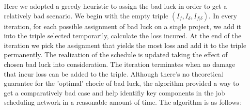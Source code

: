 \documentclass[final,3p,times]{elsarticle}
\begin{document}
Here we adopted a greedy heuristic to assign the bad luck in order to get a relatively bad scenario. We begin with the empty triple  $(I_f, I_{\delta}, I_{f|\delta})$. In every iteration, for each possible assignment of bad luck on a single project, we add it into the triple selected temporarily, calculate the loss incured. At the end of the iteration we  pick the assignment that yields the most loss and add it to the triple permanently.  The realization of the schedule is updated taking the effect of chosen bad luck into consideration. The iteration terminates when no damage that incur loss can be added to the triple. Although there's no theoretical guarantee for the 'optimal' chocie of bad luck, the algorithm provided a way to get a comparatively bad case and help identifiy key components in the job scheduling network in a reasonable amount of time. The algorithm is as follows:

\begin{algorithm}[H]\label{EstimateWorst}
\end{algorithm} 
\end{document}
